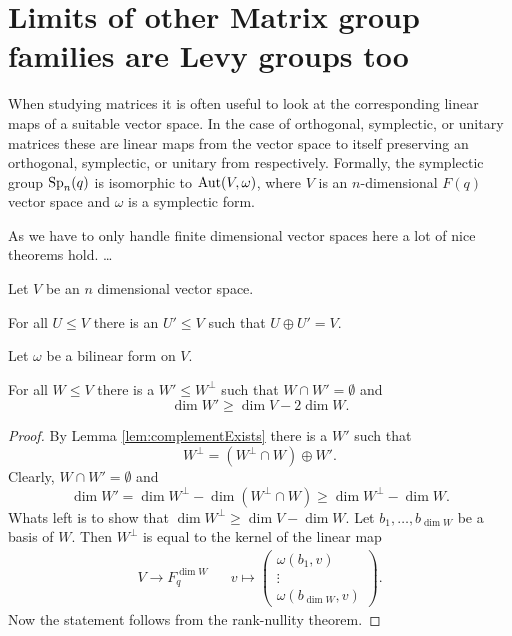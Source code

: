 \section{Limits of other Matrix group families are Levy groups too}
When studying matrices it is often useful to look at the corresponding linear maps of a suitable vector space. In the case of orthogonal, symplectic, or unitary matrices these are linear maps from the vector space to itself preserving an orthogonal, symplectic, or unitary from respectively. Formally, the symplectic group $\operatorname{Sp}_n(q)$ is isomorphic to $\operatorname{Aut}(V,\omega)$, where $V$ is an $n$-dimensional $F(q)$ vector space and $\omega$ is a symplectic form.

As we have to only handle finite dimensional vector spaces here a lot of nice theorems hold. \dots

Let $V$ be an $n$ dimensional vector space.%
\begin{lemma}\label{lem:complementExists}
For all $U\leq V$ there is an $U'\leq V$ such that $U\oplus U'=V$.
\end{lemma}

Let $\omega$ be a bilinear form on $V$.
\begin{lemma}\label{lem:largeOrthogonal}
For all $W\leq V$ there is a $W'\leq W^\bot$ such that $W\cap W'=\emptyset$ and \[\dim W'\geq \dim V-2\dim W.\]
\end{lemma}
\begin{proof}
By Lemma \ref{lem:complementExists} there is a $W'$ such that 
\[W^\bot=(W^\bot\cap W)\oplus W'.\]
Clearly, $W\cap W'=\emptyset$ and 
\[\dim W'=\dim W^\bot - \dim (W^\bot\cap W)\geq \dim W^\bot- \dim W.\]
Whats left is to show that $\dim W^\bot\geq \dim V-\dim W$. Let $b_1,\dots, b_{\dim W}$ be a basis of $W$. Then $W^\bot$ is equal to the kernel of the linear map 
\begin{align*}
V\to F_q^{\dim W}&& v\mapsto
\begin{pmatrix}
\omega(b_1,v)\\
\vdots\\
\omega(b_{\dim W},v)
\end{pmatrix}.
\end{align*}
Now the statement follows from the rank-nullity theorem.
\end{proof}

